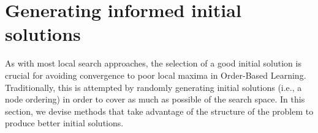 \section{Generating informed initial solutions}
\label{sec:improve}

As with most local search approaches, the selection of a good initial solution is crucial for avoiding convergence to poor local maxima in Order-Based Learning. Traditionally, this is attempted by randomly generating initial solutions (i.e., a node ordering) in order to cover as much as possible of the search space. In this section, we devise methods that take advantage of the structure of the problem to produce better initial solutions. 


